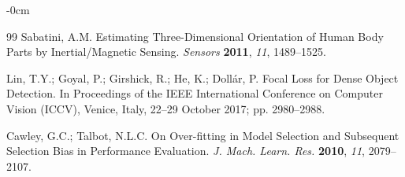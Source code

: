 \documentclass[journal,article,submit,pdftex,moreauthors]{Definitions/mdpi}
\begin{document}
\begin{adjustwidth}{-\extralength}{0cm}
\begin{thebibliography}{99}
Sabatini, A.M. Estimating Three-Dimensional Orientation of Human Body Parts by Inertial/Magnetic Sensing. \textit{Sensors} \textbf{2011}, \textit{11}, 1489--1525.

Lin, T.Y.; Goyal, P.; Girshick, R.; He, K.; Dollár, P. Focal Loss for Dense Object Detection. In Proceedings of the IEEE International Conference on Computer Vision (ICCV), Venice, Italy, 22--29 October 2017; pp. 2980--2988.

Cawley, G.C.; Talbot, N.L.C. On Over-fitting in Model Selection and Subsequent Selection Bias in Performance Evaluation. \textit{J. Mach. Learn. Res.} \textbf{2010}, \textit{11}, 2079--2107.

\end{thebibliography}

\end{adjustwidth}
\end{document}
